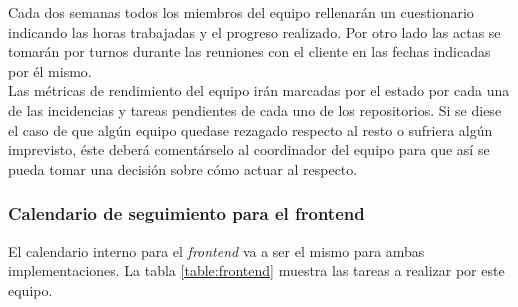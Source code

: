 \documentclass[11pt, a4paper, titlepage]{article}
\begin{document}
Cada dos semanas todos los miembros del equipo rellenarán un cuestionario indicando las horas trabajadas y el progreso realizado. Por otro lado las actas se tomarán por turnos durante las reuniones con el cliente en las fechas indicadas por él mismo.\\

Las métricas de rendimiento del equipo irán marcadas por el estado por cada una de las incidencias y tareas pendientes de cada uno de los repositorios. Si se diese el caso de que algún equipo quedase rezagado respecto al resto o sufriera algún imprevisto, éste deberá comentárselo al coordinador del equipo para que así se pueda tomar una decisión sobre cómo actuar al respecto. 

\subsubsection{Calendario de seguimiento para el frontend}
El calendario interno para el \textit{frontend} va a ser el mismo para ambas implementaciones. La tabla \ref{table:frontend} muestra las tareas a realizar por este equipo. \newline
\end{document}
